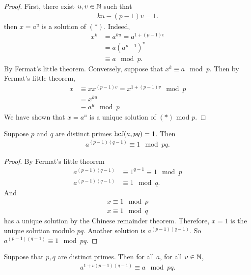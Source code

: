 \begin{proof}
	First, there exist $u,v \in \mathbb N$ such that 
	\begin{align*}
	ku - (p-1)v = 1.
	\end{align*}
	then $x = a^u$ is a solution of $(*)$. Indeed, 
	\begin{align*}
	x^k & = a^{ku} = a^{1+(p-1)v} \\
	& = a \left( a^{p-1} \right)^v \\
	& \equiv a \mod p.
	\end{align*}
	By Fermat's little theorem. Conversely, suppose that $x^k \equiv a \mod p$. Then by Fermat's little theorem,
	\begin{align*}
	x & \equiv x x^{(p-1) v} = x^{1+(p-1)v} \mod p\\
	& = x^{ku} \\
	& \equiv a^u \mod p
	\end{align*}
	We have shown that $x= a^u$ is a unique solution of $(*)$ mod $p$.
\end{proof}

\begin{pp}
	Suppose $p$ and $q$ are distinct primes $\operatorname{hcf}(a, pq) = 1$. Then
	\begin{align*}
	a^{(p-1)(q-1)} \equiv 1 \mod pq.
	\end{align*}
\end{pp}

\begin{proof}
	By Fermat's little theorem
	\begin{align*}
	a^{(p-1)(q-1)} &\equiv 1^{q-1} \equiv 1 \mod p \\
	a^{(p-1)(q-1)} & \equiv 1 \mod q.
	\end{align*}
	And
	\begin{align*}
	x \equiv 1 \mod p \\
	x \equiv 1 \mod q
	\end{align*}
	has a unique solution by the Chinese remainder theorem. Therefore, $x=1$ is the unique solution modulo $pq$.
	Another solution is $a^{(p-1)(q-1)}$. So $a^{(p-1)(q-1)} \equiv 1 \mod pq$.
\end{proof}

\begin{cl}
	Suppose that $p,q$ are distinct primes. Then for all $a$, for all $v \in \mathbb N$,
	\begin{align*}
	a^{1+v(p-1)(q-1)} \equiv a \mod pq.
	\end{align*}
\end{cl}

